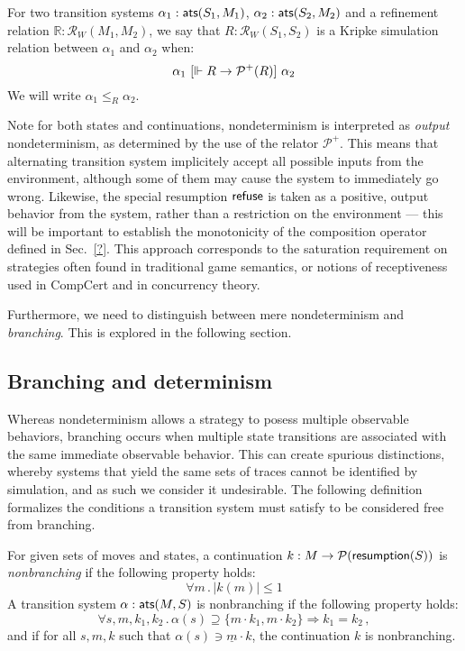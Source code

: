 \begin{definition}
For two transition systems
$\alpha_1 :  \textsf{ats} (S_1, M_1)$,
$\alpha_2 :  \textsf{ats} (S_2, M_2)$ and
a refinement relation
$\mathbb{R} : \mathcal{R}_W(M_1, M_2)$,
we say that
$R : \mathcal{R}_W(S_1, S_2)$
is a Kripke simulation relation between $\alpha_1$ and $\alpha_2$
when:
\[
    \alpha_1 \ [{\Vdash R \rightarrow \mathcal{P}^+(R)}]\  \alpha_2
\]
We will write $\alpha_1 \le_R \alpha_2$.
\end{definition}

Note for both states and continuations,
nondeterminism is interpreted as \emph{output} nondeterminism,
as determined by the use of the relator $\mathcal{P}^+$.
This means that alternating transition system
implicitely accept all possible inputs from the environment,
although some of them may cause the system to immediately go wrong.
Likewise,
the special resumption $ \textsf{refuse} $
is taken as a positive, output behavior from the system,
rather than a restriction on the environment ---
this will be important to establish the monotonicity
of the composition operator defined in Sec.~\ref{?}.
This approach corresponds to the saturation requirement on strategies
often found in traditional game semantics,
or notions of receptiveness used in CompCert
and in concurrency theory.

Furthermore, we need to distinguish between mere nondeterminism
and \emph{branching}.
This is explored in the following section.

\subsection{Branching and determinism}

Whereas nondeterminism allows a strategy to posess
multiple observable behaviors,
branching occurs when multiple state transitions
are associated with the same immediate observable behavior.
This can create spurious distinctions,
whereby systems that yield the same sets of traces
cannot be identified by simulation,
and as such we consider it undesirable.
The following definition
formalizes the conditions a transition system must satisfy
to be considered free from branching.

\begin{definition}
For given sets of moves and states,
a continuation $k : M \rightarrow \mathcal{P}( \textsf{resumption} (S))$
is \emph{nonbranching} if the following property holds:
\[ \forall m \,.\, | k(m) | \le 1 \]
A transition system $\alpha :  \textsf{ats} (M, S)$ is nonbranching
if the following property holds:
\[ \forall s, m, k_1, k_2 \,.\,
     \alpha(s) \supseteq \{ m \cdot k_1, m \cdot k_2 \} \Rightarrow
     k_1 = k_2 \,, \]
and if for all $s, m, k$ such that $\alpha(s) \ni \underline{m} \cdot k$,
the continuation $k$ is nonbranching.
\end{definition}

